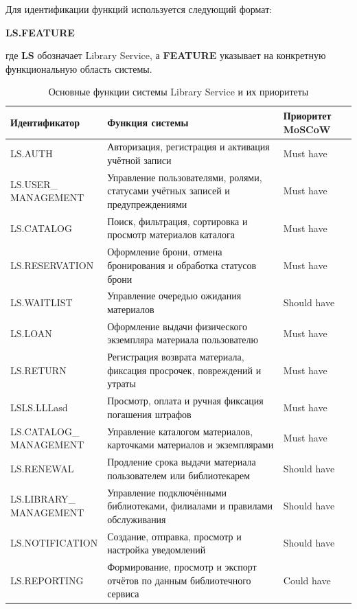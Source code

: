 \documentclass[12pt,a4paper]{article}
\begin{document}
	Для идентификации функций используется следующий формат:
	
	\begin{center}
		\textbf{LS.FEATURE}
	\end{center}
	
	где \textbf{LS} обозначает Library Service, а \textbf{FEATURE} указывает на
	конкретную функциональную область системы.
	
	\begin{table}[h]
		\centering
		\small
		\begin{tabularx}{\textwidth}{
				|>{\raggedright\arraybackslash}p{4.2cm}
				|>{\raggedright\arraybackslash}X
				|>{\raggedright\arraybackslash}p{2.5cm}|
			}
			\hline
			\textbf{Идентификатор} & \textbf{Функция системы} & \textbf{Приоритет MoSCoW} \\
			\hline
			LS.AUTH & Авторизация, регистрация и активация учётной записи & Must have \\
			\hline
			\makecell[l]{LS.USER\_\\MANAGEMENT} & Управление пользователями, ролями, статусами учётных записей и предупреждениями & Must have \\
			\hline
			LS.CATALOG & Поиск, фильтрация, сортировка и просмотр материалов каталога & Must have \\
			\hline
			LS.RESERVATION & Оформление брони, отмена бронирования и обработка статусов брони & Must have \\
			\hline
			LS.WAITLIST & Управление очередью ожидания материалов & Should have \\
			\hline
			LS.LOAN & Оформление выдачи физического экземпляра материала пользователю & Must have \\
			\hline
			LS.RETURN & Регистрация возврата материала, фиксация просрочек, повреждений и утраты & Must have \\
			\hline
			LSLS.LLLasd & Просмотр, оплата и ручная фиксация погашения штрафов & Must have \\
			\hline
			\makecell[l]{LS.CATALOG\_\\MANAGEMENT} & Управление каталогом материалов, карточками материалов и экземплярами & Must have \\
			\hline
			LS.RENEWAL & Продление срока выдачи материала пользователем или библиотекарем & Should have \\
			\hline
			\makecell[l]{LS.LIBRARY\_\\MANAGEMENT} & Управление подключёнными библиотеками, филиалами и правилами обслуживания & Should have \\
			\hline
			LS.NOTIFICATION & Создание, отправка, просмотр и настройка уведомлений & Should have \\
			\hline
			LS.REPORTING & Формирование, просмотр и экспорт отчётов по данным библиотечного сервиса & Could have \\
			\hline
		\end{tabularx}
		\caption{Основные функции системы Library Service и их приоритеты}
		\label{tab:system-features}
	\end{table}
	
\end{document}
